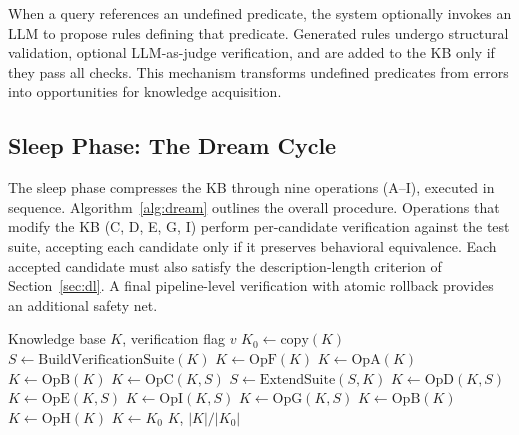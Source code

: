 \documentclass[10pt,conference]{IEEEtran}
\begin{document}
When a query references an undefined predicate, the system optionally invokes an LLM to propose rules defining that predicate. Generated rules undergo structural validation, optional LLM-as-judge verification, and are added to the KB only if they pass all checks. This mechanism transforms undefined predicates from errors into opportunities for knowledge acquisition.

\subsection{Sleep Phase: The Dream Cycle}

The sleep phase compresses the KB through nine operations (A--I), executed in sequence. Algorithm~\ref{alg:dream} outlines the overall procedure. Operations that modify the KB (C, D, E, G, I) perform per-candidate verification against the test suite, accepting each candidate only if it preserves behavioral equivalence. Each accepted candidate must also satisfy the description-length criterion of Section~\ref{sec:dl}. A final pipeline-level verification with atomic rollback provides an additional safety net.

\begin{algorithm}[t]
\caption{Dream Cycle}
\label{alg:dream}
\begin{algorithmic}[1]
\REQUIRE Knowledge base $K$, verification flag $v$
\STATE $K_0 \leftarrow \text{copy}(K)$
\STATE $S \leftarrow \text{BuildVerificationSuite}(K)$ 
\STATE $K \leftarrow \text{OpF}(K)$ 
\STATE $K \leftarrow \text{OpA}(K)$ 
\STATE $K \leftarrow \text{OpB}(K)$ 
\STATE $K \leftarrow \text{OpC}(K, S)$ 
\STATE $S \leftarrow \text{ExtendSuite}(S, K)$ 
\STATE $K \leftarrow \text{OpD}(K, S)$ 
\STATE $K \leftarrow \text{OpE}(K, S)$ 
\STATE $K \leftarrow \text{OpI}(K, S)$ 
\STATE $K \leftarrow \text{OpG}(K, S)$ 
\STATE $K \leftarrow \text{OpB}(K)$ 
\STATE $K \leftarrow \text{OpH}(K)$ 
    \STATE $K \leftarrow K_0$ 
\ENDIF
\RETURN $K$, $|K| / |K_0|$
\end{algorithmic}
\end{algorithm}
\end{document}
